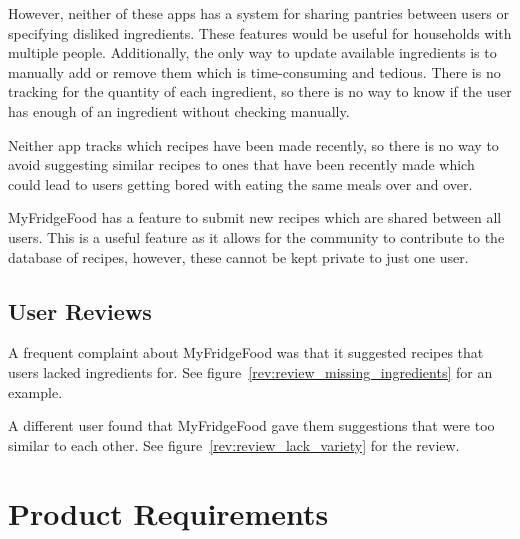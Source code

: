 However, neither of these apps has a system for sharing pantries between users or specifying disliked ingredients. These features would be useful for households with multiple people.
Additionally, the only way to update available ingredients is to manually add or remove them which is time-consuming and tedious. There is no tracking for the quantity of
each ingredient, so there is no way to know if the user has enough of an ingredient without checking manually.

Neither app tracks which recipes have been made recently, so there is no way to avoid suggesting similar recipes to ones that have been recently made which could lead to
users getting bored with eating the same meals over and over.

MyFridgeFood has a feature to submit new recipes which are shared between all users. This is a useful feature as it allows for the community to contribute to the database
of recipes, however, these cannot be kept private to just one user.

\subsection{User Reviews}

A frequent complaint about MyFridgeFood was that it suggested
recipes that users lacked ingredients for. See figure~\ref{rev:review_missing_ingredients} for an example.

A different user found that MyFridgeFood gave them suggestions that were too similar to each
other. See figure~\ref{rev:review_lack_variety} for the review.

\section{Product Requirements}


\newcommand{\requirementtype}{FR}
\newcommand{\requirement}[4]{%
    \requirementtype\stepcounter{functionalreqcounter}\arabic{functionalreqcounter}%
    &\raggedright#1&#2&#3&#4\\}

